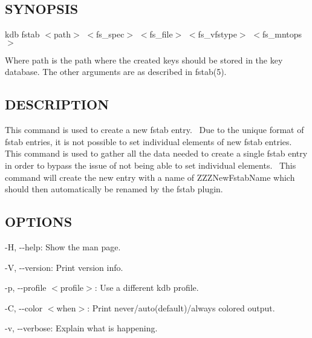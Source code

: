 \subsection*{S\+Y\+N\+O\+P\+S\+IS}

{\ttfamily kdb fstab $<$path$>$ $<$fs\+\_\+spec$>$ $<$fs\+\_\+file$>$ $<$fs\+\_\+vfstype$>$ $<$fs\+\_\+mntops$>$}

Where {\ttfamily path} is the path where the created keys should be stored in the key database. The other arguments are as described in fstab(5).

\subsection*{D\+E\+S\+C\+R\+I\+P\+T\+I\+ON}

This command is used to create a new {\ttfamily fstab} entry.~\newline
 Due to the unique format of {\ttfamily fstab} entries, it is not possible to set individual elements of new {\ttfamily fstab} entries.~\newline
 This command is used to gather all the data needed to create a single {\ttfamily fstab} entry in order to bypass the issue of not being able to set individual elements.~\newline
 This command will create the new entry with a name of {\ttfamily Z\+Z\+Z\+New\+Fstab\+Name} which should then automatically be renamed by the {\ttfamily fstab} plugin.~\newline


\subsection*{O\+P\+T\+I\+O\+NS}


\begin{DoxyItemize}
\item {\ttfamily -\/H}, {\ttfamily -\/-\/help}\+: Show the man page.
\item {\ttfamily -\/V}, {\ttfamily -\/-\/version}\+: Print version info.
\item {\ttfamily -\/p}, {\ttfamily -\/-\/profile $<$profile$>$}\+: Use a different kdb profile.
\item {\ttfamily -\/C}, {\ttfamily -\/-\/color $<$when$>$}\+: Print never/auto(default)/always colored output.
\item {\ttfamily -\/v}, {\ttfamily -\/-\/verbose}\+: Explain what is happening.
\end{DoxyItemize}

